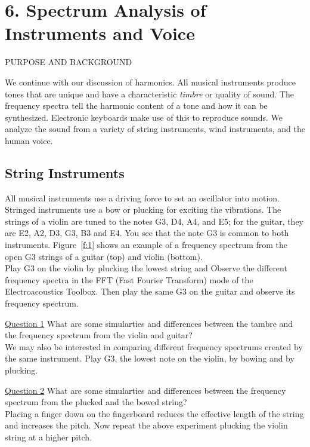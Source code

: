 \documentclass[11pt]{NSF}
\begin{document}
\section{6. Spectrum Analysis of Instruments and Voice}

PURPOSE AND BACKGROUND

We continue with our discussion of harmonics. 
All musical instruments produce tones that
are unique and have a characteristic {\em timbre} or quality of sound. The
frequency spectra tell the harmonic content of a tone and how it can
be synthesized. Electronic keyboards make use of this to reproduce
sounds. We analyze the sound from a variety of string instruments, 
wind instruments, and the human voice.

\subsection{String Instruments}

All musical instruments use a driving force to set an oscillator into
motion. Stringed instruments use a bow or plucking for exciting the
vibrations. 
The strings of a violin are tuned to the notes G3, D4, A4, and E5;
for the guitar, they are E2, A2, D3, G3, B3 and E4. You see that the
note G3 is common to both instruments. 
Figure~\ref{f:1} shows an example of a frequency spectrum from the 
open G3 strings of a guitar (top) and violin (bottom). \\

Play G3 on the violin by plucking the lowest string and Observe the different frequency
spectra in the FFT (Fast Fourier Transform) mode of the Electroacoustics Toolbox.
Then play the same G3 on the guitar and observe its frequency spectrum. 

\underline{Question 1} What are some simularties and differences between the tambre and the frequency spectrum from the violin and guitar? \\

We may also be interested in comparing different frequency spectrums created by the same instrument.
Play G3, the lowest note on the violin, by bowing and by plucking. 

\underline{Question 2} What are some simularties and differences between the frequency spectrum from the plucked and the bowed string? \\

Placing a finger down on the fingerboard reduces the effective length of the string and increases
the pitch. Now repeat the above experiment plucking the violin string at a higher pitch. \\
\end{document}

